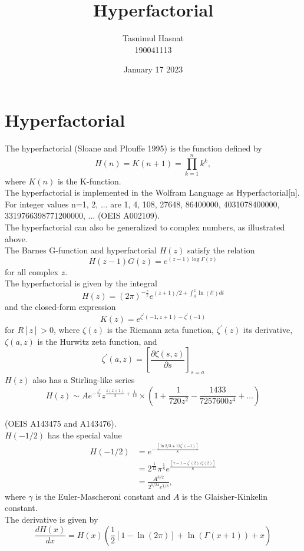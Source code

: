 \documentclass[a4paper,18pts]{article}
\title{\huge{Hyperfactorial}}
\author{\small{Tasnimul Hasnat\\190041113}}
\date{\small{January 17 2023}}
\begin{document}
\maketitle
\section{Hyperfactorial}
The hyperfactorial (Sloane and Plouffe 1995) is the function defined by 
\begin{equation}\label{1}
H(n) = K(n+1) = \prod_{k=1}^{n}k^{k},
\end{equation}
 where $K(n)$ is the K-function.\\
The hyperfactorial is implemented in the Wolfram Language as Hyperfactorial[n].\\
For integer values n=1, 2, ... are 1, 4, 108, 27648, 86400000, 4031078400000, 3319766398771200000, ... (OEIS A002109). \\
 The hyperfactorial can also be generalized to complex numbers, as illustrated above.\\
The Barnes G-function and hyperfactorial $H(z)$ satisfy the relation 
\begin{equation}\label{2}
    H(z-1)G(z) = e^{(z-1)\log{\Gamma(z)}}
\end{equation}
for all complex $z$.\\
The hyperfactorial is given by the integral 
\begin{equation}\label{3}
    H(z) = (2\pi)^{-\frac{z}{2}}e^{(z+1)/2 + \int_0^z \ln(t!) dt}
\end{equation}
and the closed-form expression 
\begin{equation}\label{4}
    K(z) = e^{\zeta^{'}(-1,z+1) - \zeta^{'}(-1)}
\end{equation}
for $R[z]>0$, where $\zeta(z)$ is the Riemann zeta function, $\zeta^{'}(z)$ its derivative, $\zeta(a,z)$ is the Hurwitz zeta function, and 
\begin{equation}\label{5}
    \zeta^{'}(a,z) = \left[\frac{\partial\zeta(s,z)}{\partial s}\right]_{s=a}
\end{equation}
$H(z)$ also has a Stirling-like series 
\begin{equation}\label{6}
    H(z) \sim Ae^{-\frac{z^2}{4}}z^{\frac{z(z+1)}{2}+\frac{1}{12}}  \times(1+\frac{1}{720z^2}-\frac{1433}{7257600z^4}+\dots)
\end{equation} \\
(OEIS A143475 and A143476). \\
$H(-1/2)$ has the special value 
\begin{align}\label{7}
    H(-1/2) &= e^{-\frac{[\ln{2}/3 + 12\zeta^{'}(-1)]}{8}} \\
    &= 2^{\frac{1}{12}}\pi^{\frac{1}{8}}e^{\frac{[\gamma - 1 - \zeta^{'}(2)/\zeta(2)]}{8}} \\
    &= \frac{A^{3/2}}{2^{1/24}e^{1/8}},    
\end{align}
where $\gamma$ is the Euler-Mascheroni constant and $A$ is the Glaisher-Kinkelin constant. \\
The derivative is given by 
\begin{equation}\label{8}
    \frac{dH(x)}{dx}=H(x)\left(\frac{1}{2}\left[1-\ln(2\pi)\right]+\ln(\Gamma(x+1))+x\right)
\end{equation}
\end{document}
